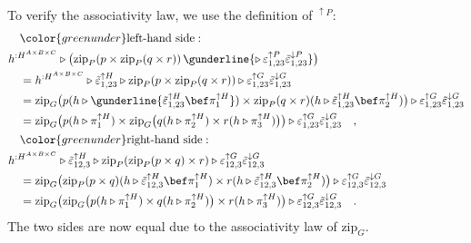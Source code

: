 To verify the associativity law, we use the definition of $^{\uparrow P}$:
\begin{align*}
 & \quad{\color{greenunder}\text{left-hand side}:}\quad\\
 & h^{:H^{A\times B\times C}}\triangleright\big(\text{zip}_{P}(p\times\text{zip}_{P}(q\times r))\,\gunderline{\triangleright\,\varepsilon_{1,23}^{\uparrow P}\tilde{\varepsilon}_{1,23}^{\downarrow P}}\big)\\
 & \quad=h^{:H^{A\times B\times C}}\triangleright\tilde{\varepsilon}_{1,23}^{\uparrow H}\triangleright\text{zip}_{P}(p\times\text{zip}_{P}(q\times r))\triangleright\varepsilon_{1,23}^{\uparrow G}\tilde{\varepsilon}_{1,23}^{\downarrow G}\\
 & \quad=\text{zip}_{G}\big(p(h\triangleright\gunderline{\tilde{\varepsilon}_{1,23}^{\uparrow H}\bef\pi_{1}^{\uparrow H}})\times\text{zip}_{P}(q\times r)(h\triangleright\tilde{\varepsilon}_{1,23}^{\uparrow H}\bef\pi_{2}^{\uparrow H})\big)\triangleright\varepsilon_{1,23}^{\uparrow G}\tilde{\varepsilon}_{1,23}^{\downarrow G}\\
 & \quad=\text{zip}_{G}\big(p(h\triangleright\pi_{1}^{\uparrow H})\times\text{zip}_{G}\big(q(h\triangleright\pi_{2}^{\uparrow H})\times r(h\triangleright\pi_{3}^{\uparrow H})\big)\big)\triangleright\varepsilon_{1,23}^{\uparrow G}\tilde{\varepsilon}_{1,23}^{\downarrow G}\quad,\\
 & \quad{\color{greenunder}\text{right-hand side}:}\quad\\
 & h^{:H^{A\times B\times C}}\triangleright\tilde{\varepsilon}_{12,3}^{\uparrow H}\triangleright\text{zip}_{P}(\text{zip}_{P}(p\times q)\times r)\triangleright\varepsilon_{12,3}^{\uparrow G}\tilde{\varepsilon}_{12,3}^{\downarrow G}\\
 & \quad=\text{zip}_{G}\big(\text{zip}_{P}(p\times q)(h\triangleright\tilde{\varepsilon}_{12,3}^{\uparrow H}\bef\pi_{1}^{\uparrow H})\times r(h\triangleright\tilde{\varepsilon}_{12,3}^{\uparrow H}\bef\pi_{2}^{\uparrow H})\big)\triangleright\varepsilon_{12,3}^{\uparrow G}\tilde{\varepsilon}_{12,3}^{\downarrow G}\\
 & \quad=\text{zip}_{G}\big(\text{zip}_{G}\big(p(h\triangleright\pi_{1}^{\uparrow H})\times q(h\triangleright\pi_{2}^{\uparrow H})\big)\times r(h\triangleright\pi_{3}^{\uparrow H})\big)\triangleright\varepsilon_{12,3}^{\uparrow G}\tilde{\varepsilon}_{12,3}^{\downarrow G}\quad.
\end{align*}
The two sides are now equal due to the associativity law of $\text{zip}_{G}$.

